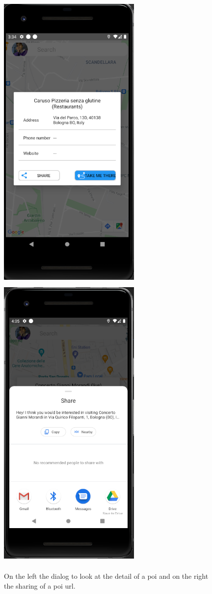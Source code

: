 \documentclass[../../main]{subfiles}
\begin{document}
\begin{figure}[H]
    \centering
    \includegraphics[width=70mm,height=150mm]{images/app/poi/poi_map_detail.png}
    \includegraphics[width=70mm,height=150mm]{images/app/share.png}
    \caption{On the left the dialog to look at the detail of a poi and on the right the sharing of a poi url.}
\end{figure}
\end{document}
